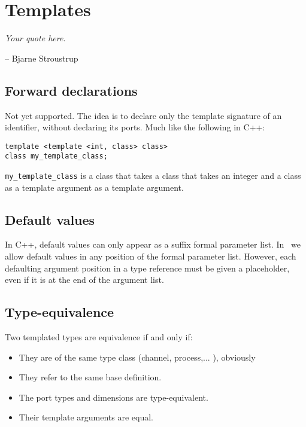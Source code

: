 
\chapter{Templates}
\label{sec:templates}

\begin{flushright}
{\itshape Your quote here.

\bigskip
-- Bjarne Stroustrup
}
\end{flushright}

\section{Forward declarations}
\label{sec:templates:forward}

Not yet supported.  
The idea is to declare only the template signature of an identifier, 
without declaring its ports.  
Much like the following in C++:

\begin{verbatim}
template <template <int, class> class>
class my_template_class;
\end{verbatim}

\noindent
\texttt{my_template_class} is a class that takes a 
class that takes an integer and a class as a template argument 
as a template argument.  

\section{Default values}
\label{sec:templates:default}

In C++, default values can only appear as a suffix formal parameter list.  
In \artxx\ we allow default values in any position of the formal 
parameter list.  
However, each defaulting argument position in a type reference
must be given a placeholder, even if it is at the end of the argument list.  


\section{Type-equivalence}
\label{sec:templates:equivalence}

Two templated types are equivalence if and only if:
\begin{itemize}
\item They are of the same type class (channel, process,... ), obviously
\item They refer to the same base definition.  
\item The port types and dimensions are type-equivalent.  
\item Their template arguments are equal.  
\end{itemize}

